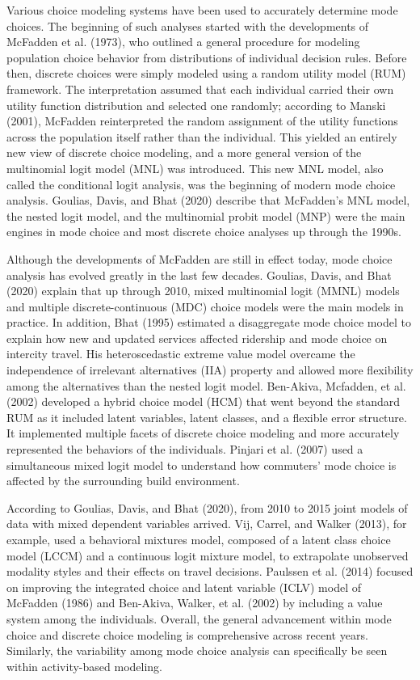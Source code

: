 \documentclass[12pt, oneside, openright]{byuthesis}
\begin{document}
Various choice modeling systems have been used to accurately determine mode choices. The beginning of such analyses started with the developments of McFadden et al. (1973), who outlined a general procedure for modeling population choice behavior from distributions of individual decision rules. Before then, discrete choices were simply modeled using a random utility model (RUM) framework. The interpretation assumed that each individual carried their own utility function distribution and selected one randomly; according to Manski (2001), McFadden reinterpreted the random assignment of the utility functions across the population itself rather than the individual. This yielded an entirely new view of discrete choice modeling, and a more general version of the multinomial logit model (MNL) was introduced. This new MNL model, also called the conditional logit analysis, was the beginning of modern mode choice analysis. Goulias, Davis, and Bhat (2020) describe that McFadden's MNL model, the nested logit model, and the multinomial probit model (MNP) were the main engines in mode choice and most discrete choice analyses up through the 1990s.

Although the developments of McFadden are still in effect today, mode choice analysis has evolved greatly in the last few decades. Goulias, Davis, and Bhat (2020) explain that up through 2010, mixed multinomial logit (MMNL) models and multiple discrete-continuous (MDC) choice models were the main models in practice. In addition, Bhat (1995) estimated a disaggregate mode choice model to explain how new and updated services affected ridership and mode choice on intercity travel. His heteroscedastic extreme value model overcame the independence of irrelevant alternatives (IIA) property and allowed more flexibility among the alternatives than the nested logit model. Ben-Akiva, Mcfadden, et al. (2002) developed a hybrid choice model (HCM) that went beyond the standard RUM as it included latent variables, latent classes, and a flexible error structure. It implemented multiple facets of discrete choice modeling and more accurately represented the behaviors of the individuals. Pinjari et al. (2007) used a simultaneous mixed logit model to understand how commuters' mode choice is affected by the surrounding build environment.

According to Goulias, Davis, and Bhat (2020), from 2010 to 2015 joint models of data with mixed dependent variables arrived. Vij, Carrel, and Walker (2013), for example, used a behavioral mixtures model, composed of a latent class choice model (LCCM) and a continuous logit mixture model, to extrapolate unobserved modality styles and their effects on travel decisions. Paulssen et al. (2014) focused on improving the integrated choice and latent variable (ICLV) model of McFadden (1986) and Ben-Akiva, Walker, et al. (2002) by including a value system among the individuals. Overall, the general advancement within mode choice and discrete choice modeling is comprehensive across recent years. Similarly, the variability among mode choice analysis can specifically be seen within activity-based modeling.
\end{document}
